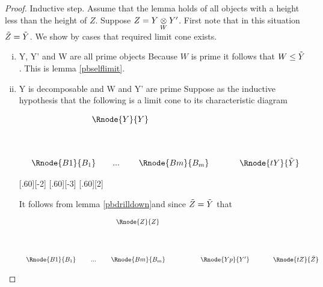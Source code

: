 \documentclass[10pt,a4paper]{scrartcl}
\begin{document}
\begin{proof}
Inductive step. Assume  that the lemma holds of all objects with a height less than the height of $Z$. Suppose $Z=\crossx{Y}{Y'}{W}$. First note that in this situation 
$\pbase{Z}=\pbase{Y}$. We show by cases that required limit cone exists.
\begin{enumerate}[(i)]
\item{Y, Y' and W are all prime objects}
Because $W$ is prime it follows that $W \leq  \pbase{Y}$. 
This is lemma \ref{pbselflimit}.


\item {Y is decomposable and W and Y' are prime}
Suppose as the inductive hypothesis that the following is a limit cone to its characteristic diagram 
\begin{center}
\begin{displaymath}
\begin{array}{c p{0.4cm} c  }
\Rnode{Y}{Y} &&   \\ [1.4cm]
\begin{array}{cp{0cm}c   p{0.1cm}     c  }					
                             \Rnode{B1}{B_1}&   & ... & & \Rnode{Bm}{B_m}
	                      \end{array} 
	 && \Rnode{tY}{\pbase{Y}}                                              
\end{array} 
\end{displaymath}

[.60][-2]
[.60][-3]
[.60][2]
\end{center}


It follows from  lemma \ref{pbdrilldown}and since $\pbase{Z}=\pbase{Y}$  that

\begin{center}
\begin{displaymath}
\begin{array}{c p{0.4cm} c  }
\Rnode{Z}{Z} &&   \\ [1.6cm]
\begin{array}{c  p{0.1cm}c   p{0.1cm}c  p{1.2cm}c }					
                             \Rnode{B1}{B_1}&& ... & & \Rnode{Bm}{B_m} && \Rnode{Yp}{Y'}
	                      \end{array} 
	 && \Rnode{tZ}{\pbase{Z}}                                              
\end{array} 
\end{displaymath}


\end{center}
\end{enumerate}
\end{proof}
\end{document}
